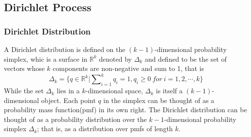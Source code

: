 \subsection{Dirichlet Process}
\subsubsection{Dirichlet Distribution}
A Dirichlet distribution is defined on the $\mathit{(k-1)}$-dimensional probability simplex, whic is a surface in $\mathbb{R}^k$ denoted by $\Delta_k
$ and defined to be the set of vectors whose $k$ components are non-negative and sum to 1, that is
\begin{equation}
\Delta_k=\{q\in \mathbb{R}^k|\sum\nolimits_{i=1}^{k}q_i=1,q_i\geq 0\ for\ i=1,2,\cdots,k\}
\end{equation}
While the set $\Delta_k$ lies in a $k$-dimensional space, $\Delta_k$ is itself a $(k-1)$-dimensional object. Each point $q$ in the simplex can be thought of as a probability mass function(pmf) in its own right. The Dirichlet distribution can be thought of as a probability distribution over the $k-1$-dimensional probability simplex $\Delta_k$; that is, as a distribution over pmfs of length $k$.


